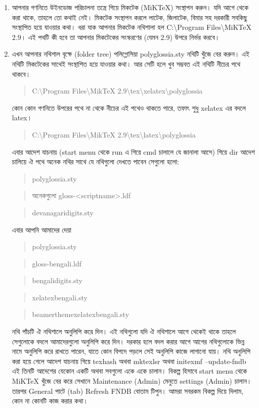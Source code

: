 \documentclass[a4paper,10pt,xetex]{article}
\begin{document}
\begin{enumerate}
\item আপনার গণনিতে উইনডোজ পরিচালনা তন্ত্রে গিয়ে মিকটেক (MiKTeX) সংস্থাপন করুন। যদি আগে থেকে করা থাকে, তাহলে তো কথাই নেই। মিকটেক সংস্থাপন করলে লাটেক, জিলাটেক, বিমার সহ দরকারী সবকিছু সংস্থাপিত হয়ে যাওয়ার কথা। ধরা যাক আপনার মিকটেক নথিশালা হল C:\textbackslash{}Program Files\textbackslash{}MiKTeX 2.9। এই পথটি কী হবে তা আপনার মিকটেকের সংস্করণের (যেমন 2.9) উপরে নির্ভর করবে। 
\item এখন আপনার নথিশাল বৃক্ষে (folder tree) পলিগ্লোসিয়া polyglossia.sty নথিটি খুঁজে বের করুন। এই নথিটি মিকটেকের সাথেই সংস্থাপিত হয়ে যাওয়ার কথা। আর সেটি হলে খুব সম্ভবত এই নথিটি নীচের পথে থাকবে।
\begin{quote}C:\textbackslash{}Program Files\textbackslash{}MikTeX 2.9\textbackslash{}tex\textbackslash{}xelatex\textbackslash{}polyglossia\end{quote} কোন কোন গণনিতে উপরের পথে না থেকে নীচের এই পথেও থাকতে পারে, তফাৎ শুধু xelatex এর বদলে latex। \begin{quote}C:\textbackslash{}Program Files\textbackslash{}MikTeX 2.9\textbackslash{}tex\textbackslash{}latex\textbackslash{}polyglossia\end{quote}এবার আদেশ যাচনায় (start menu থেকে run এ গিয়ে cmd চালালে যে জানালা আসে) গিয়ে dir আদেশ চালিয়ে ঐ পথে অনেক নথির সাথে যে নথিগুলো দেখতে পাবেন সেগুলো হলো: \begin{quote}polyglossia.sty\end{quote} \begin{quote}অনেকগুলো gloss-<scriptname>.ldf\end{quote} \begin{quote}devanagaridigits.sty\end{quote} এবার আপনি আমাদের দেয়া  \begin{quote}polyglossia.sty\end{quote}\begin{quote}gloss-bengali.ldf\end{quote} \begin{quote}bengalidigits.sty\end{quote} \begin{quote}xelatexbengali.sty\end{quote}\begin{quote}beamerthemexelatexbengali.sty\end{quote} নথি পাঁচটি ঐ নথিশালে অনুলিপি করে দিন। এই নথিগুলো যদি ঐ নথিশালে আগে থেকেই থাকে তাহলে সেগুলোকে বদলে আমাদেরগুলো অনুলিপি করে দিন। দরকার হলে বদল করার আগে আগের নথিগুলোকে ভিন্ন নামে অনুলিপি করে রাখতে পারেন, যাতে কোন বিপদে পড়লে সেই অনুলিপি কাজে লাগানো যায়। নথি অনুলিপি করা হয়ে গেলে আদেশ যাচনায় গিয়ে  texhash অথবা mktexlsr অথবা initexmf --update-fndb এই তিনটি আদেশের যেকোন একটি অথবা সবগুলো একে একে চালান। বিকল্প হিসাবে start menu থেকে MiKTeX খুঁজে বের করে সেখানে Maintenance (Admin) মেনুতে settings (Admin) চালান। তারপর General পাটে (tab) Refresh FNDB বোতাম টিপুন। আমরা সবরকম বিকল্প দিয়ে দিলাম, কোন না কোনটি কাজ করার কথা।

\end{enumerate}
\end{document}
